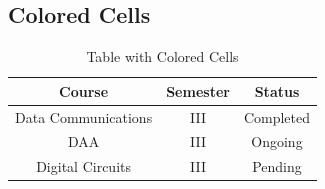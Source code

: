 \documentclass{article}
\begin{document}
\subsection{Colored Cells}

\begin{table}[h!]
    \centering
    \begin{tabular}{|c|c|c|}
        \hline
        Course & Semester & Status \\
        \hline
        Data Communications &
        III &
        \cellcolor{green!25} Completed \\
        \hline
        DAA &
        III &
        \cellcolor{yellow!30} Ongoing \\
        \hline
        Digital Circuits &
        III &
        \cellcolor{red!20} Pending \\
        \hline
    \end{tabular}
    \caption{Table with Colored Cells}
\end{table}
\end{document}
